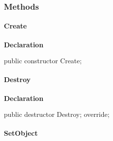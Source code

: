 \documentclass{report}
\newif\ifpdf
\begin{document}
\subsubsection*{\large{\textbf{Methods}}\normalsize\hspace{1ex}\hfill}
\paragraph*{Create}\hspace*{\fill}

\label{PasDoc_Hashes.THash-Create}
\begin{list}{}{
\setlength{\itemindent}{0cm}
\setlength{\listparindent}{0cm}
\setlength{\leftmargin}{\evensidemargin}
\addtolength{\leftmargin}{\tmplength}
\settowidth{\labelsep}{X}
\addtolength{\leftmargin}{\labelsep}
\setlength{\labelwidth}{\tmplength}
}
\item[\textbf{Declaration}\hfill]
\ifpdf
\begin{flushleft}
\fi
\begin{ttfamily}
public constructor Create;\end{ttfamily}

\ifpdf
\end{flushleft}
\fi

\end{list}
\paragraph*{Destroy}\hspace*{\fill}

\label{PasDoc_Hashes.THash-Destroy}
\begin{list}{}{
\setlength{\itemindent}{0cm}
\setlength{\listparindent}{0cm}
\setlength{\leftmargin}{\evensidemargin}
\addtolength{\leftmargin}{\tmplength}
\settowidth{\labelsep}{X}
\addtolength{\leftmargin}{\labelsep}
\setlength{\labelwidth}{\tmplength}
}
\item[\textbf{Declaration}\hfill]
\ifpdf
\begin{flushleft}
\fi
\begin{ttfamily}
public destructor Destroy; override;\end{ttfamily}

\ifpdf
\end{flushleft}
\fi

\end{list}
\paragraph*{SetObject}\hspace*{\fill}
\end{document}
